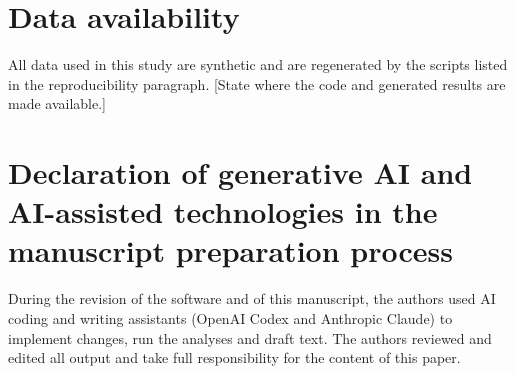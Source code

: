 \documentclass[preprint,12pt]{elsarticle}
\begin{document}
\section*{Data availability}
All data used in this study are synthetic and are regenerated by the scripts listed in the reproducibility paragraph. [State where the code and generated results are made available.]

\section*{Declaration of generative AI and AI-assisted technologies in the manuscript preparation process}
During the revision of the software and of this manuscript, the authors used AI coding and writing assistants (OpenAI Codex and Anthropic Claude) to implement changes, run the analyses and draft text. The authors reviewed and edited all output and take full responsibility for the content of this paper.
\end{document}
